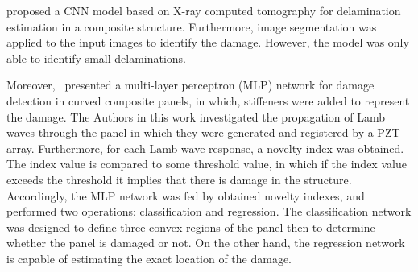 \textcite{Sammons2016} proposed a CNN model based on X-ray computed tomography for delamination estimation in a composite structure.
Furthermore, image segmentation was applied to the input images to identify the damage.
However, the model was only able to identify small delaminations.

Moreover,~\textcite{Chetwynd2008} presented a multi-layer perceptron (MLP) network for damage detection in curved composite panels, in which, stiffeners were added to represent the damage.
The Authors in this work investigated the propagation of Lamb waves through the panel in which they were generated and registered by a PZT array.
Furthermore, for each Lamb wave response, a novelty index was obtained.
The index value is compared to some threshold value, in which if the index value exceeds the threshold it implies that there is damage in the structure.
Accordingly, the MLP network was fed by obtained novelty indexes, and performed two operations: classification and regression.
The classification network was designed to define three convex regions of the panel then to determine whether the panel is damaged or not.
On the other hand, the regression network is capable of estimating the exact location of the damage.

